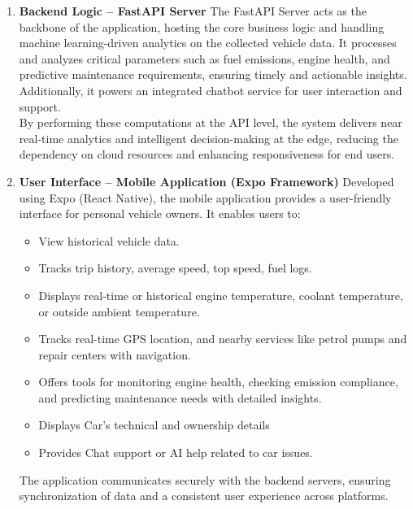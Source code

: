 \begin{enumerate}
    \item \textbf{Backend Logic – FastAPI Server}
        The FastAPI Server acts as the backbone of the application, hosting the core business logic and handling machine learning-driven analytics on the collected vehicle data. It processes and analyzes critical parameters such as fuel emissions, engine health, and predictive maintenance requirements, ensuring timely and actionable insights. Additionally, it powers an integrated chatbot service for user interaction and support.\\
        By performing these computations at the API level, the system delivers near real-time analytics and intelligent decision-making at the edge, reducing the dependency on cloud resources and enhancing responsiveness for end users.
    \item \textbf{User Interface – Mobile Application (Expo Framework)}
        Developed using Expo (React Native), the mobile application provides a user-friendly interface for personal vehicle owners. It enables users to:        
        \begin{itemize}
            \item {View historical vehicle data.}
            \item {Tracks trip history, average speed, top speed, fuel logs.}
            \item {Displays real-time or historical engine temperature, coolant temperature, or outside ambient temperature.}
            \item {Tracks real-time GPS location, and nearby services like petrol pumps and repair centers with navigation.}
            \item {Offers tools for monitoring engine health, checking emission compliance, and predicting maintenance needs with detailed insights.}
            \item {Displays Car's technical and ownership details}
            \item {Provides Chat support or AI help related to car issues.}
        \end{itemize}
        The application communicates securely with the backend servers, ensuring synchronization of data and a consistent user experience across platforms.
\end{enumerate}

